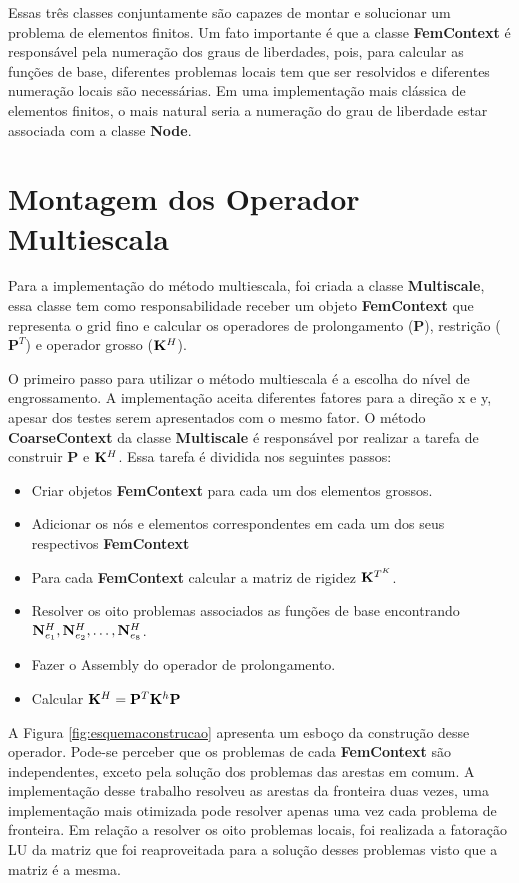 Essas três classes conjuntamente são capazes de montar e solucionar um problema de elementos finitos. Um fato importante é que a classe \textbf{FemContext} é responsável pela numeração dos graus de liberdades, pois, para calcular as funções de base, diferentes problemas locais tem que ser resolvidos e diferentes numeração locais são necessárias. Em uma implementação mais clássica de elementos finitos, o mais natural seria a numeração do grau de liberdade estar associada com a classe \textbf{Node}.


\section{Montagem dos Operador Multiescala}

Para a implementação do método multiescala, foi criada a classe \textbf{Multiscale}, essa classe tem como responsabilidade receber um objeto \textbf{FemContext} que representa o grid fino e calcular os operadores de prolongamento ($\mathbf{P}$), restrição ($\mathbf{P}^T$) e operador grosso ($\rigidmatrixcoarse$).


O primeiro passo para utilizar o método multiescala é a escolha do nível de engrossamento. A implementação aceita diferentes fatores para a direção x e y, apesar dos testes serem apresentados com o mesmo fator. O método \textbf{CoarseContext} da classe \textbf{Multiscale} é responsável por realizar a tarefa de construir $\mathbf{P}$ e $\rigidmatrixcoarse$. Essa tarefa é dividida nos seguintes passos: 

\begin{itemize}
    \item Criar objetos \textbf{FemContext} para cada um dos elementos grossos.
    \item Adicionar os nós e elementos correspondentes em cada um dos seus respectivos \textbf{FemContext}
    \item Para cada \textbf{FemContext} calcular a matriz de rigidez $\rigidmatrixelementms$.
    \item Resolver os oito problemas associados as funções de base encontrando $\basefunctionelemcoarse[1],  \basefunctionelemcoarse[2], \hdots, \basefunctionelemcoarse[8]$.
    \item Fazer o Assembly do operador de prolongamento.
    \item Calcular $\rigidmatrixcoarse = \mathbf{P}^T \rigidmatrix \mathbf{P}$
\end{itemize}

A Figura \ref{fig:esquemaconstrucao} apresenta um esboço da construção desse operador. Pode-se perceber que os problemas de cada \textbf{FemContext} são independentes, exceto pela solução dos problemas das arestas em comum. A implementação desse trabalho resolveu as arestas da fronteira duas vezes, uma implementação mais otimizada pode resolver apenas uma vez cada problema de fronteira. Em relação a resolver os oito problemas locais, foi realizada a fatoração LU da matriz que foi reaproveitada para a solução desses problemas visto que a matriz é a mesma. 

